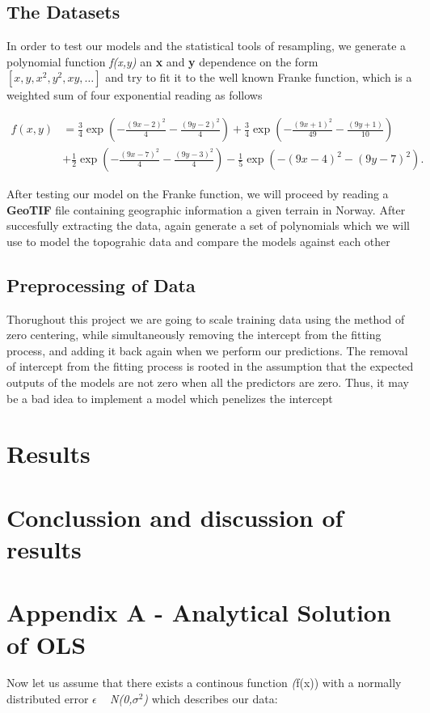 \documentclass[a4paper, 10pt]{article}
\begin{document}
\subsection{The Datasets}
In order to test our models and the statistical tools of resampling, we generate a polynomial function \emph{f(x,y)} an \textbf{x} and \textbf{y} dependence on the form $[x, y, x^2, y^2, xy, \dots]$ and try to fit it to the well known Franke function, which is a weighted sum of four exponential reading as follows


$$
\begin{align*}
f(x,y) &= \frac{3}{4}\exp{\left(-\frac{(9x-2)^2}{4} - \frac{(9y-2)^2}{4}\right)}+\frac{3}{4}\exp{\left(-\frac{(9x+1)^2}{49}- \frac{(9y+1)}{10}\right)} \\
&+\frac{1}{2}\exp{\left(-\frac{(9x-7)^2}{4} - \frac{(9y-3)^2}{4}\right)} -\frac{1}{5}\exp{\left(-(9x-4)^2 - (9y-7)^2\right) }.
\end{align*}
$$

After testing our model on the Franke function, we will proceed by reading a \textbf{GeoTIF} file containing geographic information a given terrain in Norway. After succesfully extracting the data, again generate a set of polynomials which we will use to model the topograhic data and compare the models against each other

\subsection{Preprocessing of Data}
Thorughout this project we are going to scale training data using the method of zero centering, while simultaneously removing the intercept from the fitting process, and adding it back again when we perform our predictions. The removal of intercept from the fitting process is rooted in the assumption that the expected outputs of the models are not zero when all the predictors are zero. Thus, it may be a bad idea to implement a model which penelizes the intercept


\section{Results}



\section{Conclussion and discussion of results}


\section{Appendix A - Analytical Solution of OLS}
Now let us assume that there exists a continous function \emph(f(x)) with a normally distributed error $\epsilon$ ~ \emph{N(0,$\sigma^2$)} which describes our data: 
\end{document}
